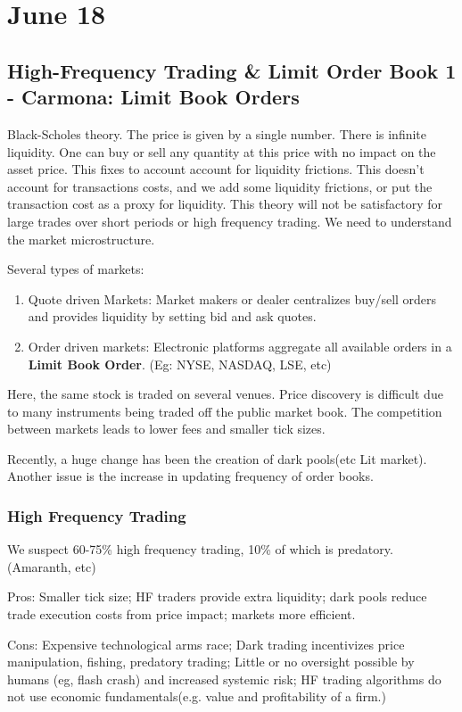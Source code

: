 \documentclass[twocolumn,openany]{book}
\begin{document}
\part{June 18}
\chapter{High-Frequency Trading \& Limit Order Book 1 - Carmona: Limit Book Orders}
Black-Scholes theory. The price is given by a single number. There is infinite liquidity. One can buy or sell any quantity at this price with no impact on the asset price. This fixes to account account for liquidity frictions. This doesn't account for transactions costs, and we add some liquidity frictions, or put the transaction cost as a proxy for liquidity. This theory will not be satisfactory for large trades over short periods or high frequency trading. We need to understand the market microstructure.

Several types of markets:
\begin{enumerate}
	\item Quote driven Markets: Market makers or dealer centralizes buy/sell orders and provides liquidity by setting bid and ask quotes.
	\item Order driven markets: Electronic platforms aggregate all available orders in a {\bf Limit Book Order}. (Eg: NYSE, NASDAQ, LSE, etc)
\end{enumerate}
Here, the same stock is traded on several venues. Price discovery is difficult due to many instruments being traded off the public market book. The competition between markets leads to lower fees and smaller tick sizes.

Recently, a huge change has been the creation of dark pools(etc Lit market). Another issue is the increase in updating frequency of order books.

\section{High Frequency Trading}
We suspect 60-75\% high frequency trading, 10\% of which is predatory. (Amaranth, etc)

Pros: Smaller tick size; HF traders provide extra liquidity; dark pools reduce trade execution costs from price impact; markets more efficient.

Cons: Expensive technological arms race; Dark trading incentivizes price manipulation, fishing, predatory trading; Little or no oversight possible by humans (eg, flash crash) and increased systemic risk; HF trading algorithms do not use economic fundamentals(e.g. value and profitability of a firm.)
\end{document}
